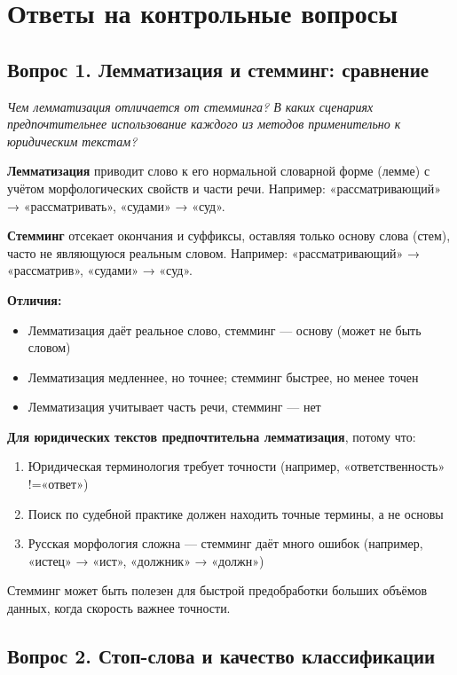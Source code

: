 \documentclass[12pt, a4paper]{report}
\begin{document}
\chapter{Ответы на контрольные вопросы}

\section{Вопрос 1. Лемматизация и стемминг: сравнение}

\textit{Чем лемматизация отличается от стемминга? В каких сценариях предпочтительнее
использование каждого из методов применительно к юридическим текстам?}

\textbf{Лемматизация} приводит слово к его нормальной словарной форме (лемме) с учётом морфологических свойств и части речи. Например: «рассматривающий» → «рассматривать», «судами» → «суд».

\textbf{Стемминг} отсекает окончания и суффиксы, оставляя только основу слова (стем), часто не являющуюся реальным словом. Например: «рассматривающий» → «рассматрив», «судами» → «суд».

\textbf{Отличия:}
\begin{itemize}
  \item Лемматизация даёт реальное слово, стемминг — основу (может не быть словом)
  \item Лемматизация медленнее, но точнее; стемминг быстрее, но менее точен
  \item Лемматизация учитывает часть речи, стемминг — нет
\end{itemize}

\textbf{Для юридических текстов предпочтительна лемматизация}, потому что:
\begin{enumerate}
  \item Юридическая терминология требует точности (например, «ответственность» !=«ответ»)
  \item Поиск по судебной практике должен находить точные термины, а не основы
  \item Русская морфология сложна — стемминг даёт много ошибок (например, «истец» → «ист», «должник» → «должн»)
\end{enumerate}

Стемминг может быть полезен для быстрой предобработки больших объёмов данных, когда скорость важнее точности.

\section{Вопрос 2. Стоп-слова и качество классификации}
\end{document}
